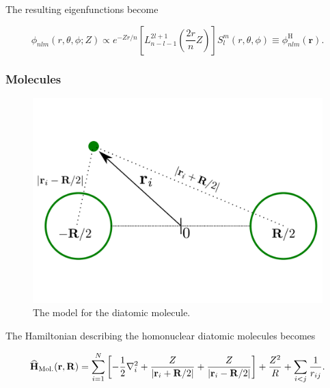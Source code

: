  \begin{frame}
  The resulting eigenfunctions become 
  
\begin{equation*}
  \phi_{nlm}(r, \theta, \phi; Z) \propto e^{-Zr/n}\left[L_{n-l-1}^{2l+1}\left(\frac{2r}{n}Z\right)\right] S_l^m(r, \theta, \phi) \equiv \phi^\mathrm{H}_{nlm}(\mathbf{r}).
\end{equation*}
 \end{frame}

 \begin{frame}
 \frametitle{Molecules}
 \begin{figure}
 \begin{center}
  \includegraphics[scale=0.3]{../graphics/Molecules.pdf}
  \caption{The model for the diatomic molecule.}
 \end{center}
\end{figure}
\end{frame}
 
\begin{frame}
 
 The Hamiltonian describing the homonuclear diatomic molecules becomes
 
 \begin{equation*}
 {\bf\widehat{H}}_{\mathrm{Mol.}}(\mathbf{r}, \mathbf{R}) = \sum_{i=1}^N \left[-\frac{1}{2}\nabla_i^2 + \frac{Z}{|\mathbf{r}_i + \mathbf{R}/2|} + \frac{Z}{|\mathbf{r}_i - \mathbf{R}/2|}\right] + \frac{Z^2}{R} + \sum_{i<j} \frac{1}{r_{ij}}.
\end{equation*}
 
\end{frame}



